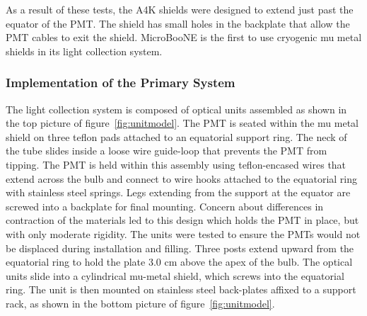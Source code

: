 As a result of these tests, the A4K shields were designed to extend just past the equator of the PMT.  The shield has small holes in the backplate that allow the PMT cables to exit the shield.   MicroBooNE is the first \lartpc to use cryogenic mu metal shields in its light collection system.  


\subsubsection{Implementation of the Primary System \label{LCUnitimplement}}


The light collection system is composed of optical units assembled as shown in the top picture of figure~\ref{fig:unitmodel}.  The PMT is seated within the mu metal shield on three teflon pads attached to an equatorial support ring.  The neck of the tube slides inside a loose wire guide-loop that prevents the PMT from tipping.  The PMT is held within this assembly using teflon-encased wires that extend across the bulb and connect to wire hooks attached to the equatorial ring with stainless steel springs. Legs extending from the support at the equator are screwed into a backplate for final mounting.  Concern about differences in contraction of the materials led to this design which holds the PMT in place, but with only moderate rigidity.  The units were tested to ensure the PMTs would not be displaced during installation and filling.  Three posts extend upward from the equatorial ring to hold the plate 3.0 cm above the apex of the bulb.   The optical units slide into a cylindrical mu-metal shield, which screws into the equatorial ring.  The unit is then mounted on stainless steel back-plates affixed to a support rack, as shown in the bottom picture of figure~\ref{fig:unitmodel}.

